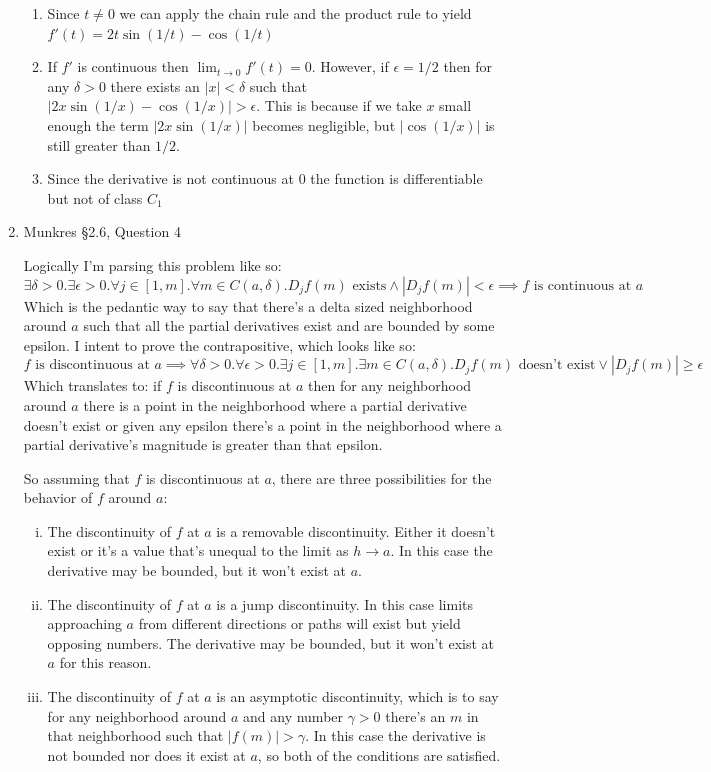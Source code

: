 \documentclass[letterpaper,10pt]{article}
\begin{document}
\begin{enumerate}
\begin{enumerate}
		\item Since $t \neq 0$ we can apply the chain rule and the product rule to yield $f'(t) = 2t \sin(1/t) - \cos(1/t)$

		\item If $f'$ is continuous then $\lim_{t \to 0} f'(t) = 0$. However, if $\epsilon = 1/2$ then for any $\delta > 0$ there exists an $|x| < \delta$ such that $|2x \sin(1/x) - \cos(1/x)| > \epsilon$. This is because if we take $x$ small enough the term $|2x \sin(1/x)|$ becomes negligible, but $|\cos (1/x)|$ is still greater than $1/2$.

		\item Since the derivative is not continuous at $0$ the function is differentiable but not of class $C_1$
	\end{enumerate}

	\item Munkres \S 2.6, Question 4

	Logically I'm parsing this problem like so:
	$$ \exists \delta > 0 . \exists \epsilon > 0 . \forall j \in [1, m] . \forall m \in C(a,\delta) . D_j f(m) \text{ exists}\wedge |D_j f(m)| < \epsilon \implies f \text{ is continuous at } a $$
	Which is the pedantic way to say that there's a delta sized neighborhood around $a$ such that all the partial derivatives exist and are bounded by some epsilon. I intent to prove the contrapositive, which looks like so:
	$$  f \text{ is discontinuous at } a  \implies \forall \delta > 0 . \forall \epsilon > 0 . \exists j \in [1, m] . \exists m \in C(a,\delta) . D_j f(m) \text{ doesn't exist}\vee |D_j f(m)| \geq \epsilon $$
	Which translates to: if $f$ is discontinuous at $a$ then for any neighborhood around $a$ there is a point in the neighborhood where a partial derivative doesn't exist or given any epsilon there's a point in the neighborhood where a partial derivative's magnitude is greater than that epsilon.

	So assuming that $f$ is discontinuous at $a$, there are three possibilities for the behavior of $f$ around $a$:
	\begin{enumerate}[i.]
		\item The discontinuity of $f$ at $a$ is a removable discontinuity. Either it doesn't exist or it's a value that's unequal to the limit as $h \to a$. In this case the derivative may be bounded, but it won't exist at $a$.
		\item The discontinuity of $f$ at $a$ is a jump discontinuity. In this case limits approaching $a$ from different directions or paths will exist but yield opposing numbers. The derivative may be bounded, but it won't exist at $a$ for this reason.
		\item The discontinuity of $f$ at $a$ is an asymptotic discontinuity, which is to say for any neighborhood around $a$ and any number $\gamma > 0$ there's an $m$ in that neighborhood such that $|f(m)| > \gamma$. In this case the derivative is not bounded nor does it exist at $a$, so both of the conditions are satisfied.
	\end{enumerate}


\end{enumerate}
\end{document}

